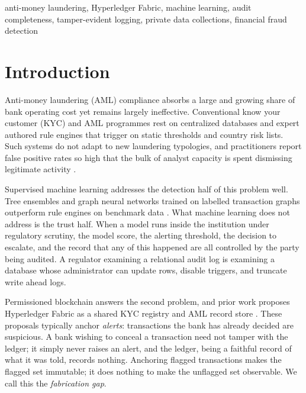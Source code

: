 \documentclass[conference]{IEEEtran}
\begin{document}
\begin{IEEEkeywords}
anti-money laundering, Hyperledger Fabric, machine learning, audit completeness,
tamper-evident logging, private data collections, financial fraud detection
\end{IEEEkeywords}

\section{Introduction}

Anti-money laundering (AML) compliance absorbs a large and growing share of bank
operating cost yet remains largely ineffective. Conventional know your customer
(KYC) and AML programmes rest on centralized databases and expert authored rule
engines that trigger on static thresholds and country risk lists. Such systems
do not adapt to new laundering typologies, and practitioners report false
positive rates so high that the bulk of analyst capacity is spent dismissing
legitimate activity \cite{oztas2024tm}.

Supervised machine learning addresses the detection half of this problem well.
Tree ensembles and graph neural networks trained on labelled transaction graphs
outperform rule engines on benchmark data
\cite{weber2019aml,elmougy2023ellipticpp,pareja2020evolvegcn}. What machine
learning does not address is the trust half. When a model runs inside the
institution under regulatory scrutiny, the model score, the alerting threshold,
the decision to escalate, and the record that any of this happened are all
controlled by the party being audited. A regulator examining a relational audit
log is examining a database whose administrator can update rows, disable
triggers, and truncate write ahead logs.

Permissioned blockchain answers the second problem, and prior work proposes
Hyperledger Fabric as a shared KYC registry and AML record store
\cite{khan2025baml,kang2019fabzk,androulaki2018fabric}. These proposals
typically anchor \emph{alerts}: transactions the bank has already decided are
suspicious. A bank wishing to conceal a transaction need not tamper with the
ledger; it simply never raises an alert, and the ledger, being a faithful record
of what it was told, records nothing. Anchoring flagged transactions makes the
flagged set immutable; it does nothing to make the unflagged set observable. We
call this the \emph{fabrication gap}.
\end{document}
